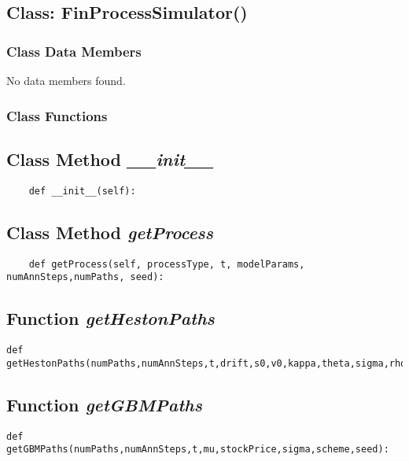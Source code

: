 \documentclass[twoside,11pt]{book}
\begin{document}
\subsection{Class: FinProcessSimulator()}


\subsubsection{Class Data Members}
No data members found.

\subsubsection{Class Functions}

\subsection{Class Method {\it \_\_init\_\_}}


\begin{lstlisting}
    def __init__(self):
\end{lstlisting}

\subsection{Class Method {\it getProcess}}


\begin{lstlisting}
    def getProcess(self, processType, t, modelParams, numAnnSteps,numPaths, seed):
\end{lstlisting}

\subsection{Function {\it getHestonPaths}}


\begin{lstlisting}
def getHestonPaths(numPaths,numAnnSteps,t,drift,s0,v0,kappa,theta,sigma,rho,scheme,seed):
\end{lstlisting}

\subsection{Function {\it getGBMPaths}}


\begin{lstlisting}
def getGBMPaths(numPaths,numAnnSteps,t,mu,stockPrice,sigma,scheme,seed):
\end{lstlisting}
\end{document}

